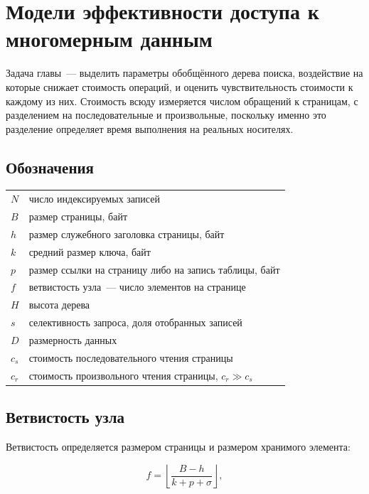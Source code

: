 \chapter{Модели эффективности доступа к многомерным данным}
\label{ch:models}

Задача главы~--- выделить параметры обобщённого дерева поиска, воздействие на
которые снижает стоимость операций, и оценить чувствительность стоимости к
каждому из них. Стоимость всюду измеряется числом обращений к страницам, с
разделением на последовательные и произвольные, поскольку именно это разделение
определяет время выполнения на реальных носителях.

\section{Обозначения}

\begin{tabular}{ll}
$N$      & число индексируемых записей \\
$B$      & размер страницы, байт \\
$h$      & размер служебного заголовка страницы, байт \\
$k$      & средний размер ключа, байт \\
$p$      & размер ссылки на страницу либо на запись таблицы, байт \\
$f$      & ветвистость узла~--- число элементов на странице \\
$H$      & высота дерева \\
$s$      & селективность запроса, доля отобранных записей \\
$D$      & размерность данных \\
$c_s$    & стоимость последовательного чтения страницы \\
$c_r$    & стоимость произвольного чтения страницы, $c_r \gg c_s$ \\
\end{tabular}

\section{Ветвистость узла}

Ветвистость определяется размером страницы и размером хранимого элемента:

\begin{equation}
\label{eq:fanout}
f = \left\lfloor \frac{B-h}{k+p+\sigma} \right\rfloor ,
\end{equation}

